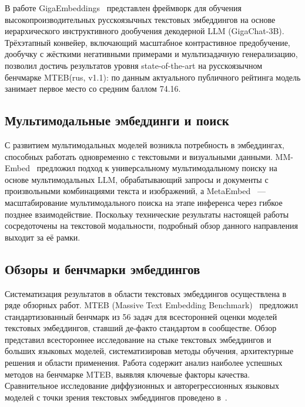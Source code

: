 В работе GigaEmbeddings~\cite{2510.22369} представлен фреймворк для обучения высокопроизводительных русскоязычных текстовых эмбеддингов на основе иерархического инструктивного дообучения декодерной LLM (GigaChat-3B). Трёхэтапный конвейер, включающий масштабное контрастивное предобучение, дообучку с жёсткими негативными примерами и мультизадачную генерализацию, позволил достичь результатов уровня state-of-the-art на русскоязычном бенчмарке MTEB(rus, v1.1): по данным актуального публичного рейтинга модель занимает первое место со средним баллом 74.16.

\subsection{Мультимодальные эмбеддинги и поиск}\label{subsec:multimodal_embeddings}

С развитием мультимодальных моделей возникла потребность в эмбеддингах, способных работать одновременно с текстовыми и визуальными данными. MM-Embed~\cite{2411.02571} предложил подход к универсальному мультимодальному поиску на основе мультимодальных LLM, обрабатывающий запросы и документы с произвольными комбинациями текста и изображений, а MetaEmbed~\cite{2509.18095} --- масштабирование мультимодального поиска на этапе инференса через гибкое позднее взаимодействие. Поскольку технические результаты настоящей работы сосредоточены на текстовой модальности, подробный обзор данного направления выходит за её рамки.

\subsection{Обзоры и бенчмарки эмбеддингов}\label{subsec:embedding_surveys}

Систематизация результатов в области текстовых эмбеддингов осуществлена в ряде обзорных работ. MTEB (Massive Text Embedding Benchmark)~\cite{2210.07316} предложил стандартизованный бенчмарк из 56 задач для всесторонней оценки моделей текстовых эмбеддингов, ставший де-факто стандартом в сообществе. Обзор \cite{2412.09165} представил всестороннее исследование на стыке текстовых эмбеддингов и больших языковых моделей, систематизировав методы обучения, архитектурные решения и области применения. Работа \cite{2406.01607} содержит анализ наиболее успешных методов на бенчмарке MTEB, выявляя ключевые факторы качества. Сравнительное исследование диффузионных и авторегрессионных языковых моделей с точки зрения текстовых эмбеддингов проведено в~\cite{2505.15045}.

